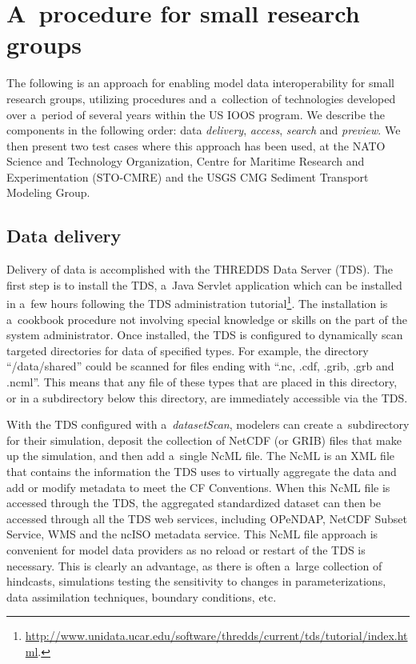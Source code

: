 \documentclass[osd, online, hvmath]{copernicus}
\begin{document}
\section{A~procedure for small research groups}

The following is an approach for enabling model data interoperability
for small research groups, utilizing procedures and a~collection of
technologies developed over a~period of several years within the US
IOOS program. We describe the components in the following order: data
\textit{delivery}, \textit{access}, \textit{search} and
\textit{preview}. We then present two test cases where this
approach has been used, at the NATO Science and Technology Organization, Centre for Maritime Research and Experimentation (STO-CMRE) and the USGS CMG Sediment
Transport Modeling Group.

\subsection{Data delivery}

Delivery of data is accomplished with the THREDDS Data Server
(TDS). The first step is to install the TDS, a~Java Servlet
application which can be installed in a~few hours following the TDS
administration
tutorial\footnote{\url{http://www.unidata.ucar.edu/software/thredds/current/tds/tutorial/index.html}.}. The
installation is a~cookbook procedure not involving special knowledge
or skills on the part of the system administrator. Once installed, the
TDS is configured to dynamically scan targeted directories for data of
specified types. For example, the directory ``/data/shared'' could be
scanned for files ending with ``.nc, .cdf, .grib, .grb and
.ncml''. This means that any file of these types that are placed in
this directory, or in a subdirectory below this directory, are
immediately accessible via the TDS.

With the TDS configured with a~\textit{datasetScan}, modelers can
create a~subdirectory for their simulation, deposit the collection of
NetCDF (or GRIB) files that make up the simulation, and then add
a~single NcML file. The NcML is an XML file that contains the
information the TDS uses to virtually aggregate the data and add or modify
metadata to meet the CF Conventions. When this NcML file is accessed
through the TDS, the aggregated standardized dataset can then be
accessed through all the TDS web services, including OPeNDAP, NetCDF
Subset Service, WMS and the ncISO metadata service. This NcML file
approach is convenient for model data providers as no reload or
restart of the TDS is necessary.  This is clearly an advantage, as
there is often a~large collection of hindcasts, simulations testing
the sensitivity to changes in parameterizations, data
assimilation techniques, boundary conditions, etc.
\end{document}
